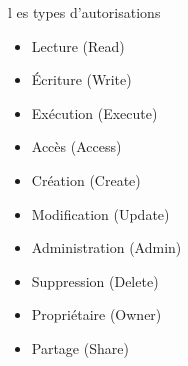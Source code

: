 \begin{frame}{l
es types d'autorisations }
    


   \begin{itemize}
       \item	Lecture (Read) 
        \item	Écriture (Write) 
         \item	Exécution (Execute)
          \item	Accès (Access) 
           \item 	Création (Create) 
            \item	Modification (Update) 
             \item	Administration (Admin) 
              \item	Suppression (Delete) 
               \item	Propriétaire (Owner) 
                \item 	Partage (Share) 
    \end{itemize}
\end{frame}